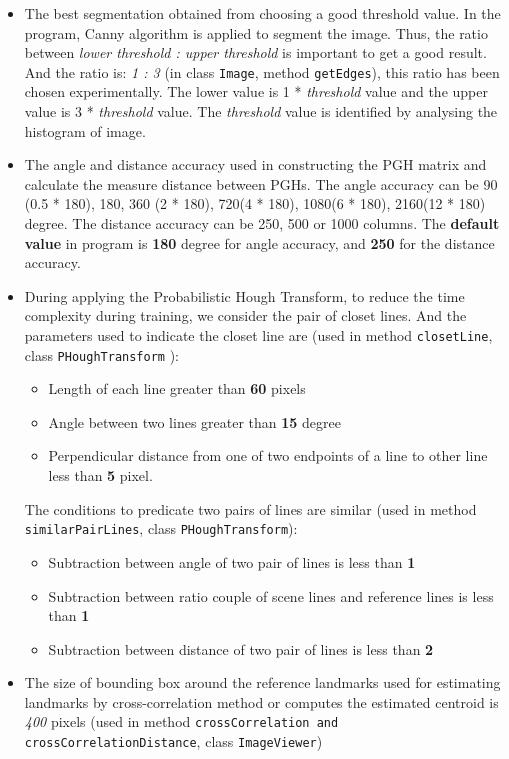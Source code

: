\begin{itemize}
\item The best segmentation obtained from choosing a good threshold value. In the program, Canny algorithm is applied to segment the image. Thus, the ratio between \textit{lower threshold : upper threshold} is important to get a good result. And the ratio is: \textit{1 : 3} (in class \texttt{Image}, method \texttt{getEdges}), this ratio has been chosen experimentally. The lower value is 1 * \textit{threshold} value and the upper value is 3 * \textit{threshold} value. The \textit{threshold} value is identified by analysing the histogram of image. 
\item The angle and distance accuracy used in constructing the PGH matrix and calculate the measure distance between PGHs. The angle accuracy can be 90 (0.5 * 180), 180, 360 (2 * 180), 720(4 * 180), 1080(6 * 180), 2160(12 * 180) degree. The distance accuracy can be 250, 500 or 1000 columns. The \textbf{default value} in program is \textbf{180} degree for angle accuracy, and \textbf{250} for the distance accuracy. 
\item During applying the Probabilistic Hough Transform, to reduce the time complexity during training, we consider the pair of closet lines. And the parameters used to indicate the closet line are (used in method \texttt{closetLine}, class \texttt{PHoughTransform} ):
	\begin{itemize}
		\item Length of each line greater than \textbf{60} pixels
		\item Angle between two lines greater than \textbf{15} degree
		\item Perpendicular distance from one of two endpoints of a line to other line less than \textbf{5} pixel.
	\end{itemize}
The conditions to predicate two pairs of lines are similar (used in method \texttt{similarPairLines}, class \texttt{PHoughTransform}):
	\begin{itemize}
		\item Subtraction between angle of two pair of lines is less than \textbf{1}
		\item Subtraction between ratio couple of scene lines and reference lines is less than \textbf{1}
		\item Subtraction between distance of two pair of lines is less than \textbf{2}
	\end{itemize}
\item The size of bounding box around the reference landmarks used for estimating landmarks by cross-correlation method or computes the estimated centroid is \textit{400} pixels (used in method \texttt{crossCorrelation and crossCorrelationDistance}, class \texttt{ImageViewer})

\end{itemize}
